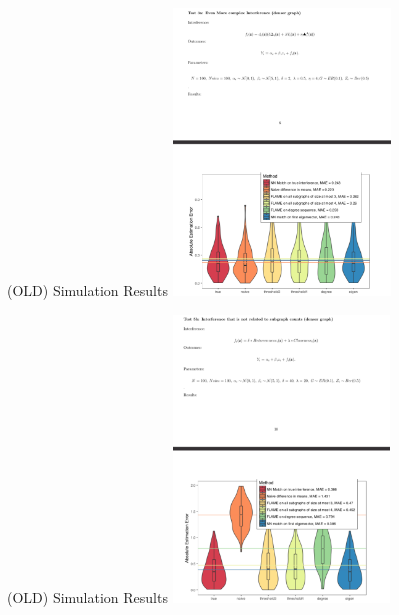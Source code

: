 \documentclass[newPxFont,numfooter,sectionpages]{beamer}
\DeclareMathOperator*{\argmin}{arg\,min}
\newcommand{\E}{\mathbb{E}}
\newcommand{\btheta}{\boldsymbol{\phi}}
\begin{document}
\begin{frame}{(OLD) Simulation Results}
\centering
\includegraphics[height=3in]{even_more_complex.png}
\end{frame}
\begin{frame}{(OLD) Simulation Results}
\centering
\includegraphics[height=3in]{unrelated_dense.png}
\end{frame}
\end{document}
